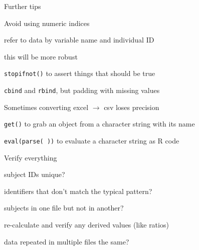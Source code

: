 \documentclass[aspectratio=169,12pt,t]{beamer}
\begin{document}
\begin{frame}{Further tips}

\bbi
\item Avoid using numeric indices
  \bi
\item refer to data by variable name and individual ID
\item this will be more {\hilit robust}
  \ei
\item {\tt stopifnot()} to assert things that should be true
\item {\tt cbind} and {\tt rbind}, but padding with missing values
\item Sometimes converting excel $\rightarrow$ csv loses precision
\item {\tt get()} to grab an object from a character string with its
  name
\item {\tt eval(parse( ))} to evaluate a character string as R code
  \ei

\end{frame}




\begin{frame}{Verify everything}

\bbi
\item subject IDs unique?
\item identifiers that don't match the typical pattern?
\item subjects in one file but not in another?
\item re-calculate and verify any derived values (like ratios)
\item data repeated in multiple files the same?
\ei

\end{frame}
\end{document}

